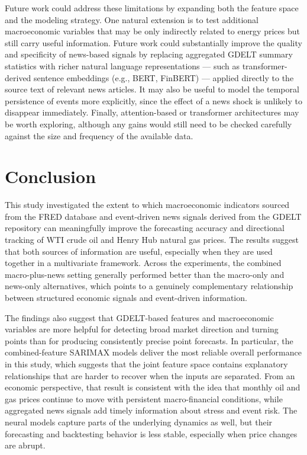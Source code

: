 \documentclass[pdflatex,sn-mathphys-num]{sn-jnl}%
\theoremstyle{thmstyleone}%
\theoremstyle{thmstyletwo}%
\theoremstyle{thmstylethree}%
\begin{document}
Future work could address these limitations by expanding both the feature space and the modeling strategy. One natural extension is to test additional macroeconomic variables that may be only indirectly related to energy prices but still carry useful information. Future work could substantially improve the quality and specificity of news-based signals by replacing aggregated GDELT summary statistics with richer natural language representations --- such as transformer-derived sentence embeddings (e.g., BERT, FinBERT) --- applied directly to the source text of relevant news articles. It may also be useful to model the temporal persistence of events more explicitly, since the effect of a news shock is unlikely to disappear immediately. Finally, attention-based or transformer architectures may be worth exploring, although any gains would still need to be checked carefully against the size and frequency of the available data.

\section{Conclusion}\label{sec13}

This study investigated the extent to which macroeconomic indicators sourced from the FRED database and event-driven news signals derived from the GDELT repository can meaningfully improve the forecasting accuracy and directional tracking of WTI crude oil and Henry Hub natural gas prices. The results suggest that both sources of information are useful, especially when they are used together in a multivariate framework. Across the experiments, the combined macro-plus-news setting generally performed better than the macro-only and news-only alternatives, which points to a genuinely complementary relationship between structured economic signals and event-driven information.

The findings also suggest that GDELT-based features and macroeconomic variables are more helpful for detecting broad market direction and turning points than for producing consistently precise point forecasts. In particular, the combined-feature SARIMAX models deliver the most reliable overall performance in this study, which suggests that the joint feature space contains explanatory relationships that are harder to recover when the inputs are separated. From an economic perspective, that result is consistent with the idea that monthly oil and gas prices continue to move with persistent macro-financial conditions, while aggregated news signals add timely information about stress and event risk. The neural models capture parts of the underlying dynamics as well, but their forecasting and backtesting behavior is less stable, especially when price changes are abrupt.
\end{document}
